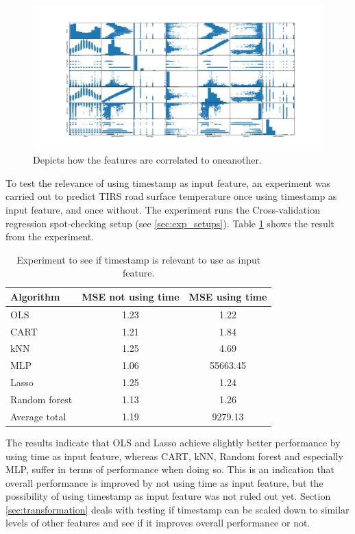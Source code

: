 \begin{figure}[H] 
	\centering
	\includegraphics[width=1\textwidth]{media/correlations_ver2.png}
	\caption{Depicts how the features are correlated to oneanother.}
	\label{img:correlations_noerr}
\end{figure}

	To test the relevance of using timestamp as input feature, an experiment was carried out to predict TIRS road surface temperature once using timestamp as input feature, and once without. The experiment runs the Cross-validation regression spot-checking setup (see \ref{sec:exp_setups}). Table \ref{table:timeinput} shows the result from the experiment.

	\begin{table}[H] %
	\centering
	\caption{Experiment to see if timestamp is relevant to use as input feature. }
		\begin{tabular}[3]{l | c | c}
    			Algorithm & MSE not using time & MSE using time \\
    			\hline
			OLS & 1.23 & 1.22 \\
			CART & 1.21 & 1.84 \\
			kNN & 1.25 & 4.69 \\
			MLP & 1.06 & 55663.45 \\
			Lasso & 1.25 & 1.24 \\
			Random forest & 1.13 & 1.26 \\
			\hline
			Average total & 1.19 & 9279.13
			\label{table:timeinput}
		\end{tabular}
	\end{table}

	The results indicate that OLS and Lasso achieve slightly better performance by using time as input feature, whereas CART, kNN, Random forest and especially MLP, suffer in terms of performance when doing so. This is an indication that overall performance is improved by not using time as input feature, but the possibility of using timestamp as input feature was not ruled out yet. Section \ref{sec:transformation} deals with testing if timestamp can be scaled down to similar levels of other features and see if it improves overall performance or not.

